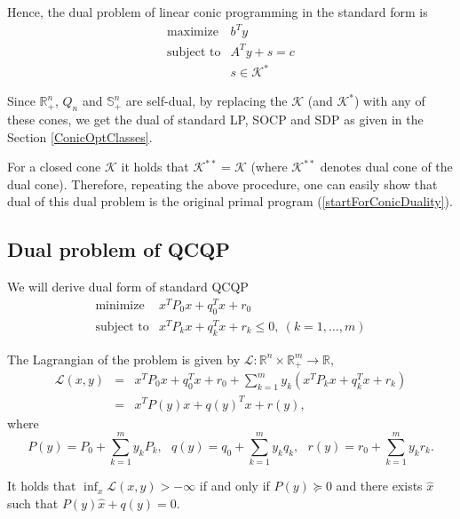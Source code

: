 \documentclass[12pt]{book}
\theoremstyle{definition}
\begin{document}
Hence, the dual problem of linear conic programming in the standard form is 
\begin{equation}
 \begin{array}{ll}
\mbox{maximize} & b^Ty\\
\mbox{subject to}& A^Ty + s = c\\
& s \in \mathcal{K}^*
\end{array}
\end{equation}

Since $\mathbb{R}^n_+$, $Q_n$ and $\mathbb{S}^n_+$ are self-dual, by replacing the $\mathcal{K}$ (and $\mathcal{K}^*$) with any of these cones, we get 
the dual of standard LP, SOCP and SDP as given in the Section \ref{ConicOptClasses}.


\rem \label{doubleDualConeProg} For a closed cone $\mathcal{K}$ it holds that $\mathcal{K}^{**} = \mathcal{K}$ (where $\mathcal{K}^{**}$ denotes dual cone of the dual cone). Therefore, repeating the above procedure, one can easily show that dual of this dual problem is the original primal program (\ref{startForConicDuality}).




\subsection{Dual problem of QCQP}


We will derive dual form of standard QCQP
\begin{equation}
\begin{array}{ll}
\mbox{minimize}& x^TP_0x + q_0^Tx + r_0 \\
\mbox{subject to}& x^TP_kx + q_k^Tx + r_k \leq 0, \  (k = 1,\dots ,m)
\end{array} 
\end{equation}

The Lagrangian of the problem is given by $\mathcal{L}: \mathbb{R}^n\times\mathbb{R}^m_+ \rightarrow \mathbb{R},$
\begin{eqnarray}
\mathcal{L}(x,y) &=&  x^TP_0x + q_0^Tx + r_0 + \sum_{k=1}^m y_k(x^TP_kx + q_k^Tx + r_k) \\
 &=& x^TP(y)x + q(y)^Tx + r(y),
\end{eqnarray}
where %
\begin{equation} 
P(y) = P_0 + \sum_{k = 1}^m y_kP_k, \ \ \  q(y) = q_0 + \sum_{k = 1}^m y_kq_k, \ \ \ r(y) = r_0 + \sum_{k =1}^m y_kr_k. 
\end{equation}

It holds that $\inf_x\mathcal{L}(x,y) > -\infty$ if and only if $P(y)\succeq 0$ and there exists $\hat{x}$ such that  $P(y)\hat{x} + q(y) = 0.$
\end{document}
